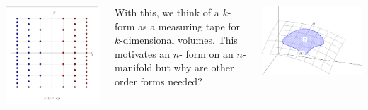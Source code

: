 \documentclass[20pt,margin=1in,innermargin=-4.5in,blockverticalspace=-0.25in]{tikzposter}
\begin{document}
\begin{columns}
{\begin{center}
                \includegraphics[scale=0.3]{xdxdyform.png}
            \end{center}
            With this, we think of a $k$-form as a measuring tape for $k$-dimensional volumes. This motivates an $n$- form on an $n$-manifold but why are other order forms needed? 
            \begin{center}
                \includegraphics[scale=0.3]{atom-manifolds.png}\qquad

\end{center}}
\end{columns}
\end{document}

